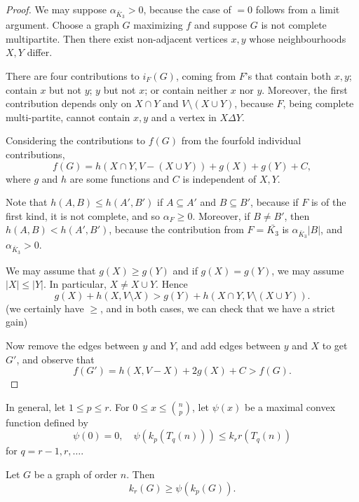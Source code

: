 \documentclass[a4paper]{article}
\begin{document}
\begin{proof}
  We may suppose $\alpha_{\bar{K}_3} > 0$, because the case of $= 0$ follows from a limit argument. Choose a graph $G$ maximizing $f$ and suppose $G$ is not complete multipartite. Then there exist non-adjacent vertices $x, y$ whose neighbourhoods $X, Y$ differ.

  There are four contributions to $i_F(G)$, coming from $F$'s that contain both $x, y$; contain $x$ but not $y$; $y$ but not $x$; or contain neither $x$ nor $y$. Moreover, the first contribution depends only on $X \cap Y$ and $V \setminus (X \cup Y)$, because $F$, being complete multi-partite, cannot contain $x, y$ and a vertex in $X \Delta Y$.

  Considering the contributions to $f(G)$ from the fourfold individual contributions,
  \[
    f(G) = h(X \cap Y, V - (X \cup Y)) + g(X) + g(Y) + C,
  \]
  where $g$ and $h$ are some functions and $C$ is independent of $X, Y$.

  Note that $h(A, B) \leq h(A', B')$ if $A \subseteq A'$ and $B \subseteq B'$, because if $F$ is of the first kind, it is not complete, and so $\alpha_F \geq 0$. Moreover, if $B \not= B'$, then $h(A, B) < h(A', B')$, because the contribution from $F = \bar{K_3}$ is $\alpha_{\bar{K}_3} |B|$, and $\alpha_{\bar{K}_3} > 0$.

  We may assume that $g(X) \geq g(Y)$ and if $g(X) = g(Y)$, we may assume $|X| \leq |Y|$. In particular, $X \not= X \cup Y$. Hence
  \[
    g(X) + h(X, V \setminus X) > g(Y) + h(X \cap Y, V \setminus (X \cup Y)).
  \]
  (we certainly have $\geq$, and in both cases, we can check that we have a strict gain)

  Now remove the edges between $y$ and $Y$, and add edges between $y$ and $X$ to get $G'$, and observe that
  \[
    f(G') = h(X, V - X) + 2 g(X) + C > f(G).
  \]
\end{proof}

In general, let $1 \leq p \leq r$. For $0 \leq x \leq \binom{n}{p}$, let $\psi(x)$ be a maximal convex function defined by
\[
  \psi(0) = 0,\quad \psi(k_p(T_q(n))) \leq k_rr(T_q(n))
\]
for $q = r - 1, r, \ldots$.

\begin{thm}[Bollob\'as, 1976]
  Let $G$ be a graph of order $n$. Then
  \[
    k_r(G) \geq \psi(k_p(G)).
  \]
\end{thm}
\end{document}
